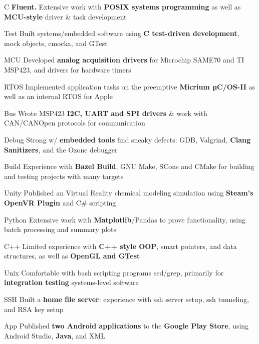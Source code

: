 \begin{cvskills}

 \cvskill
    {C} %
    {\textbf{Fluent.} Extensive work with \textbf{POSIX systems programming} as well as \textbf{MCU-style} driver \& task development}%

 \cvskill
    {Test} %
    {Built systems/embedded software using \textbf{C test-driven development}, mock objects, cmocka, and GTest} %

 \cvskill
    {MCU} %
    {Developed \textbf{analog acquisition drivers} for Microchip SAME70 and TI MSP423, and drivers for hardware timers} %

 \cvskill
    {RTOS} %
    {Implemented application tasks on the preemptive \textbf{Micrium µC/OS-II} as well as an internal RTOS for Apple  } %

 \cvskill
    {Bus} %
    {Wrote MSP423 \textbf{I2C, UART and SPI drivers} \& work with CAN/CANOpen protocols for communication}

 \cvskill
    {Debug} %
    {Strong w/ \textbf{embedded tools} find sneaky defects: GDB, Valgrind, \textbf{Clang Sanitizers}, and the Ozone debugger} %

 \cvskill
    {Build} %
    {Experience with \textbf{Bazel Build}, GNU Make, SCons and CMake for building and testing projects with many targets} %


 \cvskill
    {Unity} %
    {Published an Virtual Reality chemical modeling simulation using \textbf{Steam's OpenVR Plugin} and C\# scripting}

 \cvskill
    {Python} %
    {Extensive work with \textbf{Matplotlib}/Pandas to prove functionality, using batch processing and summary plots} 

 \cvskill
    {C++} %
    {Limited experience with \textbf{C++ style OOP}, smart pointers, and data structures, as well as \textbf{OpenGL and GTest}}%
    
 \cvskill
    {Unix} %
    {Comfortable with bash scripting programs sed/grep, primarily for \textbf{integration testing} systems-level software} %

 \cvskill
    {SSH} %
    {Built a \textbf{home file server}: experience with ssh server setup, ssh tunneling, and RSA key setup} %

 \cvskill
    {App} %
    {Published \textbf{two Android applications} to the \textbf{Google Play Store}, using Android Studio, \textbf{Java}, and XML} %


\end{cvskills}
